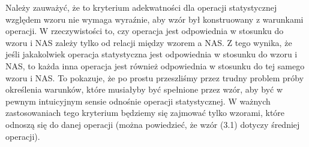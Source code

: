 \documentclass[12pt,a4paper]{report}
\begin{document}
Należy zauważyć, że to kryterium adekwatności dla operacji statystycznej względem wzoru nie wymaga wyraźnie, aby wzór był konstruowany z warunkami operacji. W rzeczywistości to, czy operacja jest odpowiednia w stosunku do wzoru i NAS zależy tylko od relacji między wzorem a NAS. Z tego wynika, że jeśli jakakolwiek operacja statystyczna jest odpowiednia w stosunku do wzoru i NAS, to każda inna operacja jest również odpowiednia w stosunku do tej samego wzoru i NAS. To pokazuje, że po prostu przeszliśmy przez trudny problem próby określenia warunków, które musiałyby być spełnione przez wzór, aby być w pewnym intuicyjnym sensie odnośnie operacji statystycznej. W ważnych zastosowaniach tego kryterium będziemy się zajmować tylko wzorami, które odnoszą się do danej operacji (można powiedzieć, że wzór (3.1) dotyczy średniej operacji).
\end{document}
